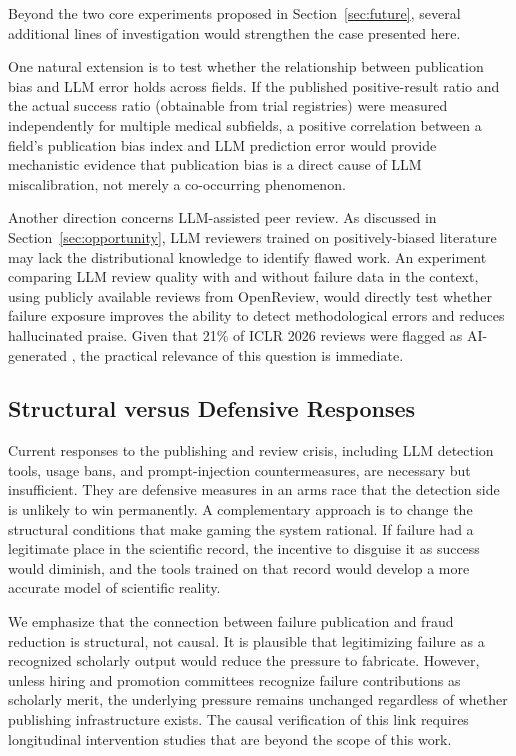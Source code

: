 Beyond the two core experiments proposed in
Section~\ref{sec:future}, several additional lines of investigation
would strengthen the case presented here.

One natural extension is to test whether the relationship between
publication bias and LLM error holds across fields. If the published
positive-result ratio and the actual success ratio (obtainable from
trial registries) were measured independently for multiple medical
subfields, a positive correlation between a field's publication
bias index and LLM prediction error would provide mechanistic
evidence that publication bias is a direct cause of LLM
miscalibration, not merely a co-occurring phenomenon.

Another direction concerns LLM-assisted peer review. As discussed
in Section~\ref{sec:opportunity}, LLM reviewers trained on
positively-biased literature may lack the distributional knowledge
to identify flawed work. An experiment comparing LLM review quality
with and without failure data in the context, using publicly
available reviews from OpenReview, would directly test whether
failure exposure improves the ability to detect methodological
errors and reduces hallucinated praise. Given that 21\% of ICLR
2026 reviews were flagged as AI-generated
\citep{pangram2025iclr}, the practical relevance of this question
is immediate.

\subsection{Structural versus Defensive Responses}

Current responses to the publishing and review crisis, including
LLM detection tools, usage bans, and prompt-injection
countermeasures, are necessary but insufficient. They are defensive
measures in an arms race that the detection side is unlikely to win
permanently. A complementary approach is to change the structural
conditions that make gaming the system rational. If failure had a
legitimate place in the scientific record, the incentive to disguise
it as success would diminish, and the tools trained on that record
would develop a more accurate model of scientific reality.

We emphasize that the connection between failure publication and
fraud reduction is structural, not causal. It is plausible that
legitimizing failure as a recognized scholarly output would reduce
the pressure to fabricate. However, unless hiring and promotion
committees recognize failure contributions as scholarly merit, the
underlying pressure remains unchanged regardless of whether
publishing infrastructure exists. The causal verification of this
link requires longitudinal intervention studies that are beyond the
scope of this work.

